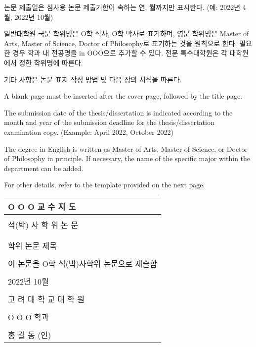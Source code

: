 \documentclass[11pt]{report}
\numberwithin{figure}{section}
\theoremstyle{plain}
\theoremstyle{definition}
\theoremstyle{corollary}
\theoremstyle{definition}
\theoremstyle{plain}
\theoremstyle{definition}
\theoremstyle{plain}
\begin{document}
논문 제출일은 심사용 논문 제출기한이 속하는 연, 월까지만 표시한다. (예: 2022년 4월, 2022년 10월)

일반대학원 국문 학위명은 O학 석사, O학 박사로 표기하며, 영문 학위명은 Master of Arts, Master of Science, Doctor of Philosophy로 표기하는 것을 원칙으로 한다.
필요한 경우 학과 내 전공명을 in OOO으로 추가할 수 있다.
전문 특수대학원은 각 대학원에서 정한 학위명에 따른다.

기타 사항은 논문 표지 작성 방법 및 다음 장의 서식을 따른다.

\bigskip

A blank page must be inserted after the cover page, followed by the title page.

The submission date of the thesis/dissertation is indicated according to the month and year of the submission deadline for the thesis/dissertation examination copy.
(Example: April 2022, October 2022)

The degree in English is written as Master of Arts, Master of Science, or Doctor of Philosophy in principle.
If necessary, the name of the specific major within the department can be added.

For other details, refer to the template provided on the next page.

\newpage
\noindent
\begin{tabularx}{\textwidth}{| >{\centering\arraybackslash}X |}
\arrayrulecolor{blue}
\hline
\Large O O O 교 수 지 도 \\\hline
\\[-8pt]\hline
\Large 석(박) 사 학 위 논 문 \\\hline
\rule{0pt}{60pt}\\\hline
\\[-15pt]
\huge 학위 논문 제목\\
\rule{0pt}{60pt}\\\hline
\Large 이 논문을 O학 석(박)사학위 논문으로 제출함 \\\hline
\rule{0pt}{50pt}\\\hline
\large 2022년 10월 \\\hline
\rule{0pt}{50pt}\\\hline
\LARGE 고 려 대 학 교  대 학 원 \\\hline
\\[-8pt]\hline
\Large O O O 학과\\\hline
\\[10pt]\hline
\Large 홍 길 동 (인)\\\hline
\end{tabularx}
\end{document}
